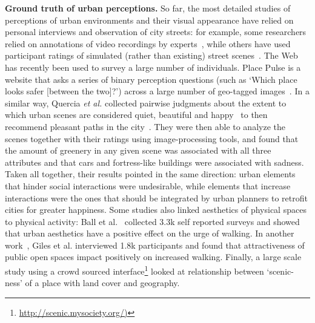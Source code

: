 \vspace{4pt}\noindent
\textbf{Ground truth of urban perceptions.} So far, the most detailed studies of perceptions of urban environments and their visual appearance have relied on personal interviews and observation of city streets: for example, some researchers relied on annotations of video recordings by experts~\cite{sampson04seeing}, while others have used participant ratings of simulated (rather than existing) street scenes~\cite{lindal2012}. The Web has recently been used to survey a large number of individuals. Place Pulse is a website that asks a series of binary perception questions (such as `Which place looks safer [between the two]?') across a large number of geo-tagged images~\cite{salesses2013collaborative}. In a similar way, Quercia \emph{et al.} collected pairwise judgments about the extent to which urban scenes are considered quiet, beautiful and happy~\cite{quercia2014aesthetic} to then recommend pleasant paths in the city~\cite{quercia2014shortest}. They were then able to analyze the scenes together with their ratings using image-processing tools, and found that the amount of greenery in any given scene was associated with all three attributes and that cars and fortress-like buildings were associated with sadness. Taken all together, their results pointed in the same direction: urban elements that hinder social interactions were undesirable, while elements that increase interactions were the ones that should be integrated by urban planners to retrofit cities for greater happiness. Some studies also linked aesthetics of physical spaces to physical activity: Ball et al.~\cite{ball2001perceived} collected 3.3k self reported surveys and showed that urban aesthetics have a positive effect on the urge of walking. In another work~\cite{giles2005increasing}, Giles et al. interviewed 1.8k participants and found that attractiveness of public open spaces impact positively on increased walking. Finally, a large scale study using a crowd sourced interface\footnote{\url{http://scenic.mysociety.org/)}} looked at relationship between `scenic-ness' of a place with land cover and geography.

